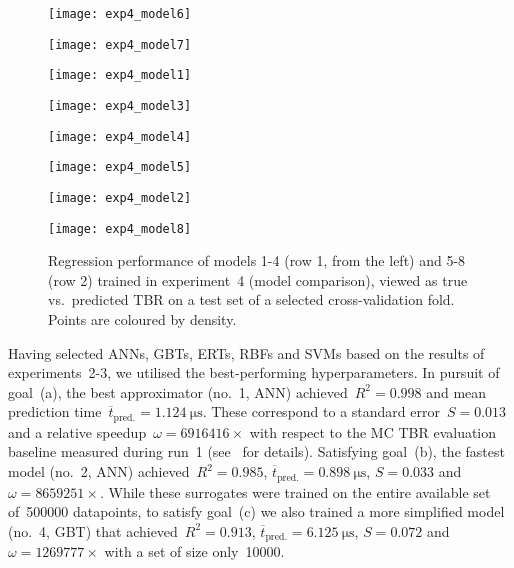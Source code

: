 \begin{figure}[h]
	\centering
	\begin{minipage}{0.25\textwidth}
		\centering
		\texttt{[image: exp4\_model6]}
	\end{minipage}\hfill%
	\begin{minipage}{0.25\textwidth}
		\centering
		\texttt{[image: exp4\_model7]}
	\end{minipage}\hfill%
	\begin{minipage}{0.25\textwidth}
		\centering
		\texttt{[image: exp4\_model1]}
	\end{minipage}\hfill%
	\begin{minipage}{0.25\textwidth}
		\centering
		\texttt{[image: exp4\_model3]}
	\end{minipage}

	\begin{minipage}{0.25\textwidth}
		\centering
		\texttt{[image: exp4\_model4]}
	\end{minipage}\hfill%
	\begin{minipage}{0.25\textwidth}
		\centering
		\texttt{[image: exp4\_model5]}
	\end{minipage}\hfill%
	\begin{minipage}{0.25\textwidth}
		\centering
		\texttt{[image: exp4\_model2]}
	\end{minipage}\hfill%
	\begin{minipage}{0.25\textwidth}
		\centering
		\texttt{[image: exp4\_model8]}
	\end{minipage}
	\caption{Regression performance of models 1-4 (row 1, from the left) and 5-8
		(row 2) trained in experiment~4 (model comparison), viewed
		as true vs.~predicted TBR on a test set of a selected cross-validation
		fold. Points are coloured by density.}
	\label{fig:reg-performance}
\end{figure}

Having selected ANNs, GBTs, ERTs, RBFs and SVMs based on the results of
experiments~2-3, we utilised the best-performing hyperparameters.
In pursuit of goal~(a), the best approximator (no.~1,
ANN) achieved~$R^2=\num{0.998}$ and mean prediction
time~$\overline{t}_{\text{pred.}}=\SI{1.124}{\micro\second}$. These correspond
to a standard error~$S=\num{0.013}$ and a relative speedup~$\omega=\num{6916416} \times$
with respect to the MC TBR evaluation baseline measured during run~1
(see~ for details). Satisfying
goal~(b), the fastest model (no.~2, ANN) achieved~$R^2=\num{0.985}$,
$\overline{t}_{\text{pred.}}=\SI{0.898}{\micro\second}$, $S=\num{0.033}$
and~$\omega=\num{8659251} \times$.
While these surrogates
were trained on the entire available set of~\num{500000} datapoints, to satisfy
goal~(c) we also trained a more simplified model (no.~4, GBT)
that achieved~$R^2=\num{0.913}$,
$\overline{t}_{\text{pred.}}=\SI{6.125}{\micro\second}$, $S=\num{0.072}$ and $\omega=\num{1269777} \times$
with a set of size only~\num{10000}.

